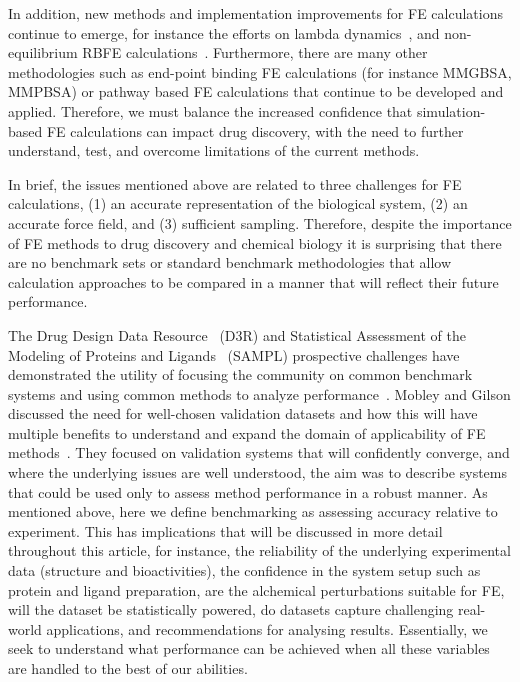 \documentclass[9pt,bestpractices]{livecoms}
\begin{document}
In addition, new methods and implementation improvements for FE calculations continue to emerge, for instance the efforts on lambda dynamics~\cite{knightMultisiteDynamicsSimulated2011,vilseckPredictingBindingFree2018}, and non-equilibrium RBFE calculations~\cite{gapsysLargeScaleRelative2020,rufaChemicalAccuracyAlchemical2020}. 
Furthermore, there are many other methodologies such as end-point binding FE calculations (for instance MMGBSA, MMPBSA) or pathway based FE calculations that continue to be developed and applied. Therefore, we must balance the increased confidence that simulation-based FE calculations can impact drug discovery, with the need to further understand, test, and overcome limitations of the current methods.

In brief, the issues mentioned above are related to three challenges for FE calculations,
(1) an accurate representation of the biological system, 
(2) an accurate force field, and 
(3) sufficient sampling. 
Therefore, despite the importance of FE methods to drug discovery and chemical biology it is surprising that there are no benchmark sets or standard benchmark methodologies that allow calculation approaches to be compared in a manner that will reflect their future performance. 

The Drug Design Data Resource~\cite{_d3r_} (D3R) and Statistical Assessment of the Modeling of Proteins and Ligands~\cite{mobley_sampl_} (SAMPL) prospective challenges have demonstrated the utility of focusing the community on common benchmark systems and using common methods to analyze performance~\cite{geballe_sampl2_2010,muddana_blind_2012,muddana_prediction_2012,muddana_sampl4_2014,gathiaka_d3r_2016,bannan_blind_2016,yin_overview_2017,gaieb_d3r_2018,gaieb_d3r_2019,parks_d3r_2020}. Mobley and Gilson discussed the need for well-chosen validation datasets and how this will have multiple benefits to understand and expand the domain of applicability of FE methods~\cite{mobleyPredictingBindingFree2017}. They focused on validation systems that will confidently converge, and where the underlying issues are well understood, the aim was to describe systems that could be used only to assess method performance in a robust manner. As mentioned above, here we define benchmarking as assessing accuracy relative to experiment. This has implications that will be discussed in more detail throughout this article, for instance, the reliability of the underlying experimental data (structure and bioactivities), the confidence in the system setup such as protein and ligand preparation, are the alchemical perturbations suitable for FE, will the dataset be statistically powered, do datasets capture challenging real-world applications, and recommendations for analysing results. Essentially, we seek to understand what performance can be achieved when all these variables are handled to the best of our abilities.    
\end{document}
